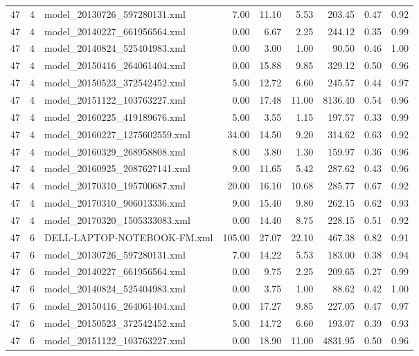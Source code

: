 \begin{table}[ht]
\begin{tabular}{rrlrrrrrr}
   47 &   4 & model\_20130726\_597280131.xml & 7.00 & 11.10 & 5.53 & 203.45 & 0.47 & 0.92 \\ 
   47 &   4 & model\_20140227\_661956564.xml & 0.00 & 6.67 & 2.25 & 244.12 & 0.35 & 0.99 \\ 
   47 &   4 & model\_20140824\_525404983.xml & 0.00 & 3.00 & 1.00 & 90.50 & 0.46 & 1.00 \\ 
   47 &   4 & model\_20150416\_264061404.xml & 0.00 & 15.88 & 9.85 & 329.12 & 0.50 & 0.96 \\ 
   47 &   4 & model\_20150523\_372542452.xml & 5.00 & 12.72 & 6.60 & 245.57 & 0.44 & 0.97 \\ 
   47 &   4 & model\_20151122\_103763227.xml & 0.00 & 17.48 & 11.00 & 8136.40 & 0.54 & 0.96 \\ 
   47 &   4 & model\_20160225\_419189676.xml & 5.00 & 3.55 & 1.15 & 197.57 & 0.33 & 0.99 \\ 
   47 &   4 & model\_20160227\_1275602559.xml & 34.00 & 14.50 & 9.20 & 314.62 & 0.63 & 0.92 \\ 
   47 &   4 & model\_20160329\_268958808.xml & 8.00 & 3.80 & 1.30 & 159.97 & 0.36 & 0.96 \\ 
   47 &   4 & model\_20160925\_2087627141.xml & 9.00 & 11.65 & 5.42 & 287.62 & 0.43 & 0.96 \\ 
   47 &   4 & model\_20170310\_195700687.xml & 20.00 & 16.10 & 10.68 & 285.77 & 0.67 & 0.92 \\ 
   47 &   4 & model\_20170310\_906013336.xml & 9.00 & 15.40 & 9.80 & 262.15 & 0.62 & 0.93 \\ 
   47 &   4 & model\_20170320\_1505333083.xml & 0.00 & 14.40 & 8.75 & 228.15 & 0.51 & 0.92 \\ 
   47 &   6 & DELL-LAPTOP-NOTEBOOK-FM.xml & 105.00 & 27.07 & 22.10 & 467.38 & 0.82 & 0.91 \\ 
   47 &   6 & model\_20130726\_597280131.xml & 7.00 & 14.22 & 5.53 & 183.00 & 0.38 & 0.94 \\ 
   47 &   6 & model\_20140227\_661956564.xml & 0.00 & 9.75 & 2.25 & 209.65 & 0.27 & 0.99 \\ 
   47 &   6 & model\_20140824\_525404983.xml & 0.00 & 3.75 & 1.00 & 88.62 & 0.42 & 1.00 \\ 
   47 &   6 & model\_20150416\_264061404.xml & 0.00 & 17.27 & 9.85 & 227.05 & 0.47 & 0.97 \\ 
   47 &   6 & model\_20150523\_372542452.xml & 5.00 & 14.72 & 6.60 & 193.07 & 0.39 & 0.93 \\ 
   47 &   6 & model\_20151122\_103763227.xml & 0.00 & 18.90 & 11.00 & 4831.95 & 0.50 & 0.96 \\ 

\end{tabular}
\end{table}
